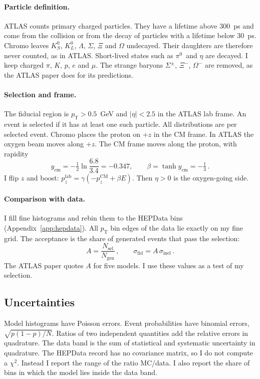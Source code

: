 \documentclass[11pt,a4paper]{article}
\newcommand{\pizero}{\ensuremath{\pi^{0}}}
\newcommand{\pT}{\ensuremath{p_{\mathrm{T}}}}
\begin{document}
\paragraph{Particle definition.}
ATLAS counts primary charged particles.
They have a lifetime above 300~ps and come from the collision or from the decay of particles with a lifetime below 30~ps.
Chromo leaves $K^{0}_{S}$, $K^{0}_{L}$, $\Lambda$, $\Sigma$, $\Xi$ and $\Omega$ undecayed.
Their daughters are therefore never counted, as in ATLAS.
Short-lived states such as \pizero\ and $\eta$ are decayed.
I keep charged $\pi$, $K$, $p$, $e$ and $\mu$.
The strange baryons $\Sigma^{\pm}$, $\Xi^{-}$, $\Omega^{-}$ are removed, as the ATLAS paper does for its predictions.

\paragraph{Selection and frame.}
The fiducial region is $\pT>0.5$~GeV and $|\eta|<2.5$ in the ATLAS lab frame.
An event is selected if it has at least one such particle.
All distributions are per selected event.
Chromo places the proton on $+z$ in the CM frame.
In ATLAS the oxygen beam moves along $+z$.
The CM frame moves along the proton, with rapidity
\begin{equation}
  y_{\mathrm{cm}}=-\tfrac12\ln\frac{6.8}{3.4}=-0.347,\qquad
  \beta=\tanh y_{\mathrm{cm}}=-\tfrac13\,.
  \label{eq:ycm}
\end{equation}
I flip $z$ and boost: $p_z^{\mathrm{lab}}=\gamma(-p_z^{\mathrm{CM}}+\beta E)$.
Then $\eta>0$ is the oxygen-going side.

\paragraph{Comparison with data.}
I fill fine histograms and rebin them to the HEPData bins (Appendix~\ref{app:hepdata}).
All $\pT$ bin edges of the data lie exactly on my fine grid.
The acceptance is the share of generated events that pass the selection:
\begin{equation}
  A=\frac{N_{\mathrm{sel}}}{N_{\mathrm{gen}}}\,,\qquad \sigma_{\mathrm{fid}}=A\,\sigma_{\mathrm{inel}}\,.
  \label{eq:acc}
\end{equation}
The ATLAS paper quotes $A$ for five models. I use these values as a test of my selection.

\subsection{Uncertainties}
Model histograms have Poisson errors.
Event probabilities have binomial errors, $\sqrt{p(1-p)/N}$.
Ratios of two independent quantities add the relative errors in quadrature.
The data band is the sum of statistical and systematic uncertainty in quadrature.
The HEPData record has no covariance matrix, so I do not compute a $\chi^{2}$.
Instead I report the range of the ratio MC/data.
I also report the share of bins in which the model lies inside the data band.
\end{document}
